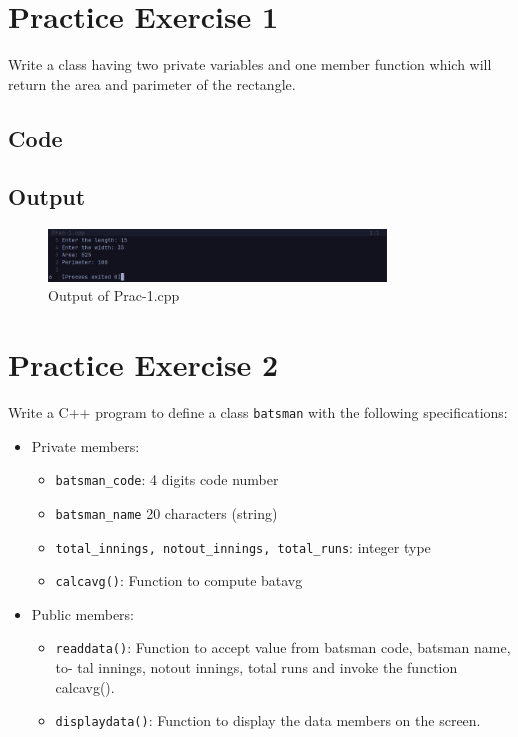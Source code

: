 \documentclass[12pt]{article}
\begin{document}
\FloatBarrier
\section*{Practice Exercise 1}
Write a class having two private variables and one member function which will return the area and parimeter of the rectangle. 

\subsection*{Code}


\subsection*{Output}
\begin{figure}[htpb]
    \centering
    \includegraphics[width=0.8\textwidth]{Prac-1.png}
    \caption{Output of Prac-1.cpp}
\end{figure}


\FloatBarrier
\section*{Practice Exercise 2}
Write a C++ program to define a class \texttt{batsman} with the following specifications:
\begin{itemize}
    \item Private members:
    \begin{itemize}
        \item \texttt{batsman\_code}: 4 digits code number
        \item \texttt{batsman\_name} 20 characters (string)
        \item \texttt{total\_innings, notout\_innings, total\_runs}: integer type
        \item \texttt{calcavg()}: Function to compute batavg
    \end{itemize}
    \item Public members:
    \begin{itemize}
        \item \texttt{readdata()}: Function to accept value from batsman code, batsman name, to- tal innings, notout innings, total runs and invoke the function calcavg().
        \item \texttt{displaydata()}: Function to display the data members on the screen.
    \end{itemize}
\end{itemize}
\end{document}

